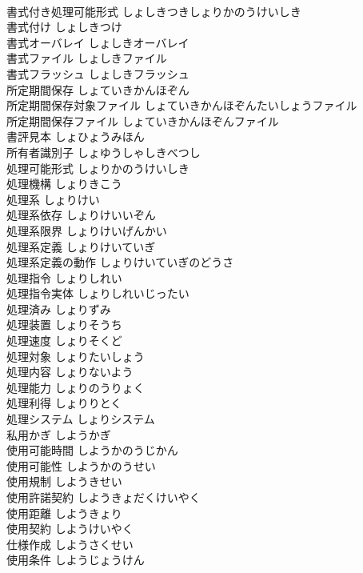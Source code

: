 \documentclass[8pt]{extreport}
\begin{document}
\begin{CJK}{UTF8}{min}
\\	書式付き処理可能形式	しょしきつきしょりかのうけいしき	
\\	書式付け	しょしきつけ	
\\	書式オーバレイ	しょしきオーバレイ	
\\	書式ファイル	しょしきファイル	
\\	書式フラッシュ	しょしきフラッシュ	
\\	所定期間保存	しょていきかんほぞん	
\\	所定期間保存対象ファイル	しょていきかんほぞんたいしょうファイル	
\\	所定期間保存ファイル	しょていきかんほぞんファイル	
\\	書評見本	しょひょうみほん	
\\	所有者識別子	しょゆうしゃしきべつし	
\\	処理可能形式	しょりかのうけいしき	
\\	処理機構	しょりきこう	
\\	処理系	しょりけい	
\\	処理系依存	しょりけいいぞん	
\\	処理系限界	しょりけいげんかい	
\\	処理系定義	しょりけいていぎ	
\\	処理系定義の動作	しょりけいていぎのどうさ	
\\	処理指令	しょりしれい	
\\	処理指令実体	しょりしれいじったい	
\\	処理済み	しょりずみ	
\\	処理装置	しょりそうち	
\\	処理速度	しょりそくど	
\\	処理対象	しょりたいしょう	
\\	処理内容	しょりないよう	
\\	処理能力	しょりのうりょく	
\\	処理利得	しょりりとく	
\\	処理システム	しょりシステム	
\\	私用かぎ	しようかぎ	
\\	使用可能時間	しようかのうじかん	
\\	使用可能性	しようかのうせい	
\\	使用規制	しようきせい	
\\	使用許諾契約	しようきょだくけいやく	
\\	使用距離	しようきょり	
\\	使用契約	しようけいやく	
\\	仕様作成	しようさくせい	
\\	使用条件	しようじょうけん	

\end{CJK}
\end{document}
